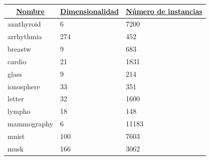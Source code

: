 \begin{table}[H]
	\begin{tabular}{|l|l|l|}
		\hline
		\multicolumn{1}{|c|}{{\ul \textbf{Nombre}}} & \multicolumn{1}{c|}{{\ul \textbf{Dimensionalidad}}} & \multicolumn{1}{c|}{{\ul \textbf{Número de instancias}}} \\ \hline
		annthyroid                                  & 6                                                   & 7200                                                     \\ \hline
		arrhythmia                                  & 274                                                 & 452                                                      \\ \hline
		breastw                                     & 9                                                   & 683                                                      \\ \hline
		cardio                                      & 21                                                  & 1831                                                     \\ \hline
		glass                                       & 9                                                   & 214                                                      \\ \hline
		ionosphere                                  & 33                                                  & 351                                                      \\ \hline
		letter                                      & 32                                                  & 1600                                                     \\ \hline
		lympho                                      & 18                                                  & 148                                                      \\ \hline
		mammography                                 & 6                                                   & 11183                                                    \\ \hline
		mnist                                       & 100                                                 & 7603                                                     \\ \hline
		musk                                        & 166                                                 & 3062                                                     \\ \hline

\end{tabular}
\end{table}
